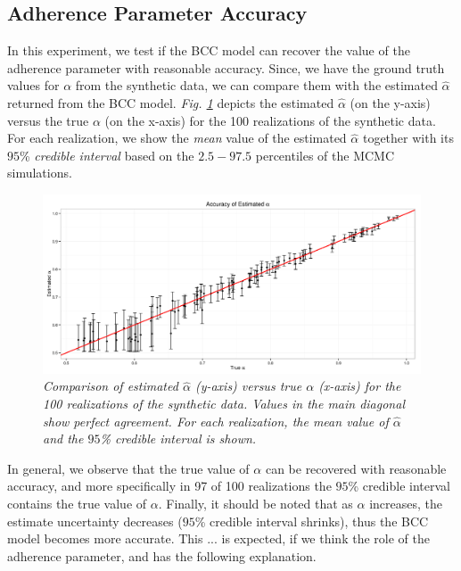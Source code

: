 \subsection{Adherence Parameter Accuracy } \label{integr-synth-alpha-sect}
In this experiment, we test if the BCC model can recover the value of the adherence parameter with reasonable accuracy. Since, we have the ground truth values for $\alpha$ from the synthetic data, we can compare them with the estimated $\hat{\alpha}$ returned from the BCC model. \emph{Fig. \ref{adherence-test-pic}} depicts the estimated $\hat{\alpha}$ (on the y-axis) versus the true $\alpha$ (on the x-axis) for the 100 realizations of the synthetic data. For each realization, we show the \emph{mean} value of the estimated $\hat{\alpha}$ together with its $95$\% \emph{credible interval} based on the $2.5 - 97.5$ percentiles of the MCMC simulations. 
\begin{figure}[!ht]
\begin{center}
 \includegraphics[scale = 0.41]{images/adherenceTest.png}
\caption{\emph{Comparison of estimated $\hat{\alpha}$ (y-axis) versus true $\alpha$ (x-axis) for the 100 realizations of the synthetic data. Values in the main diagonal show perfect agreement. For each realization, the mean value of $\hat{\alpha}$ and the $95$\% credible interval is shown.}}
\label{adherence-test-pic}
\end{center}
\end{figure}

In general, we observe that the true value of $\alpha$ can be recovered with reasonable accuracy, and more specifically in 97 of 100 realizations the $95$\% credible interval contains the true value of $\alpha$. Finally, it should be noted that as $\alpha$ increases, the estimate uncertainty decreases (\ie $95$\% credible interval shrinks), thus the BCC model becomes more accurate. This ... is expected, if we think the role of the adherence parameter, and has the following explanation. 

